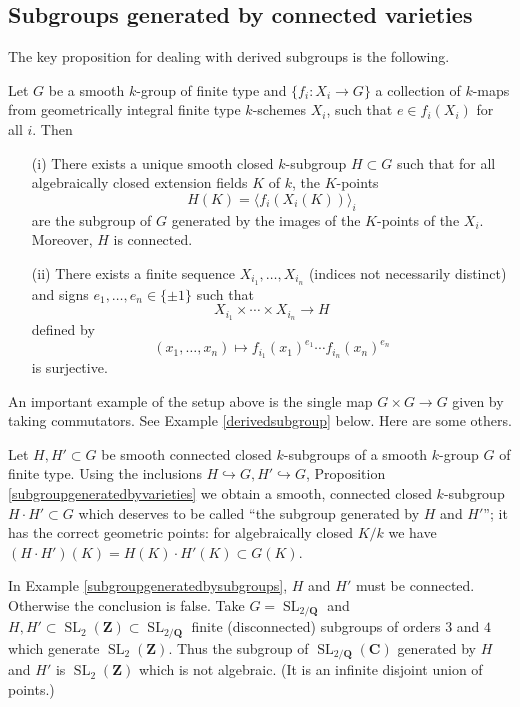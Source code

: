 \documentclass[10pt]{article}
\newcommand{\CC}{\mathbf{C}}
\newcommand{\QQ}{\mathbf{Q}}
\newcommand{\ZZ}{\mathbf{Z}}
\newcommand{\SL}{\operatorname{SL}}
\renewcommand{\(}{\left(}
\renewcommand{\)}{\right)}
\newcommand{\into}{\hookrightarrow}
\numberwithin{thm}{subsection}
\begin{document}
\subsection{Subgroups generated by connected varieties}
The key proposition for dealing with derived subgroups is the following.
\begin{prop}\label{subgroupgeneratedbyvarieties}
Let $G$ be a smooth $k$-group of finite type
and $\{f_i:X_i\to G\}$ a collection of $k$-maps
from geometrically integral finite type $k$-schemes $X_i$,
such that $e\in f_i(X_i)$ for all $i$. 
Then
\begin{itemize}
\item[(i)]There exists a unique smooth closed $k$-subgroup $H\subset G$
such that for all algebraically closed extension fields $K$ of $k$,
the $K$-points 
\[H(K)=\langle f_i(X_i(K))\rangle_i\]
are the subgroup of $G$ generated by the images of the $K$-points of the $X_i$.
Moreover, $H$ is connected.
\item[(ii)]There exists a finite sequence $X_{i_1},\ldots, X_{i_n}$
(indices not necessarily distinct)
and signs $e_1,\ldots, e_n\in\{\pm1\}$
such that
\[X_{i_1}\times\cdots\times X_{i_n}\to H\]
defined by
\[(x_1,\ldots, x_n)\mapsto f_{i_1}(x_1)^{e_1}\cdots f_{i_n}(x_n)^{e_n}\]
is surjective.
\end{itemize}
\end{prop}
An important example of the setup above is the single map $G\times G\to G$
given by taking commutators. See Example \ref{derivedsubgroup}
below. Here are some others.
\begin{ex}\label{subgroupgeneratedbysubgroups}
Let $H,H'\subset G$ be smooth connected closed $k$-subgroups
of a smooth $k$-group $G$ of finite type.
Using the inclusions $H\into G, H'\into G$,
Proposition \ref{subgroupgeneratedbyvarieties}
we obtain a smooth, connected closed $k$-subgroup
$H\cdot H'\subset G$
which deserves to be called ``the subgroup generated by $H$ and $H'$'';
it has the correct geometric points:
for algebraically closed $K/k$
we have $(H\cdot H')(K)=H(K)\cdot H'(K)\subset G(K)$.
\end{ex}
\begin{rem}\label{sl2Zremark}
In Example \ref{subgroupgeneratedbysubgroups},
$H$ and $H'$ must be connected. Otherwise the conclusion is false.
Take $G=\SL_{2/\QQ}$ and $H,H'\subset \SL_2(\ZZ)\subset \SL_{2/\QQ}$
finite (disconnected) subgroups of orders $3$ and $4$ which generate
$\SL_2(\ZZ)$.
Thus the subgroup of $\SL_{2/\QQ}(\CC)$ generated
by $H$ and $H'$ is $\SL_2(\ZZ)$ which is not algebraic.
(It is an infinite disjoint union of points.)
\end{rem}
\end{document}

